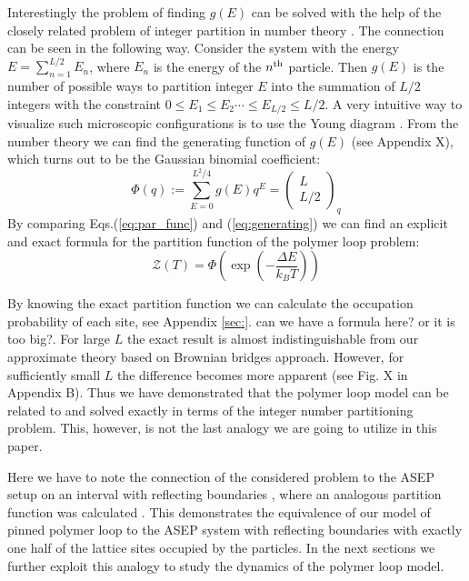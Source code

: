 \documentclass[aps,showpacs,twocolumn,floatfix,prx,superscriptaddress]{revtex4-1}
\begin{document}
Interestingly the problem of finding $g(E)$ can be solved with the help of the closely related problem of integer partition in number theory \cite{andrews1998theory}. 
The connection can be seen in the following way. Consider the system with the energy $E=\sum_{n=1}^{L/2}E_n$, where $E_n$ is the energy of the $n^{\rm{th}}$ particle. Then $g(E)$ is the number of possible ways to partition integer $E$ into the summation of $L/2$ integers with the constraint $0\le E_1\le E_2\cdots\le E_{L/2}\le L/2$.
A very intuitive way to visualize such microscopic configurations is to use the Young diagram \cite{andrews1998theory}. From the number theory \cite{andrews1998theory} we can find the generating function of $g(E)$ (see Appendix X), which turns out to be the Gaussian binomial coefficient:
\begin{equation}
    \Phi (q) := \sum_{E=0}^{L^2/4} g(E) q^E = \left(\begin{array}{c} L \\ L/2 \end{array}\right)_q
\label{eq:generating}
\end{equation}
By comparing Eqs.(\ref{eq:par_func}) and (\ref{eq:generating}) we can find an explicit and exact formula for the partition function of the polymer loop problem:
\begin{equation}
\label{eq:par_func_exact}
    \mathcal{Z}\left(T\right) = \Phi \left(\exp\left(-\frac{\Delta E}{k_B T}\right)\right) 
\end{equation}


By knowing the exact partition function we can calculate the occupation probability of each site, see Appendix \ref{sec:}. {\color{red} can we have a formula here? or it is too big?}. For large $L$ the exact result is almost indistinguishable from our approximate theory based on Brownian bridges approach. However, for sufficiently small $L$ the difference becomes more apparent (see Fig. X in Appendix B). Thus we have demonstrated that the polymer loop model can be related to and solved exactly in terms of the integer number partitioning problem. This, however, is not the last analogy we are going to utilize in this paper.

Here we have to note the connection of the considered problem to the ASEP setup on an interval with reflecting boundaries \cite{}, where an analogous partition function was calculated \cite{}. This demonstrates the equivalence of our model of pinned polymer loop to the ASEP system with reflecting boundaries with exactly one half of the lattice sites occupied by the particles. In the next sections we further exploit this analogy to study the dynamics of the polymer loop model.
\end{document}
